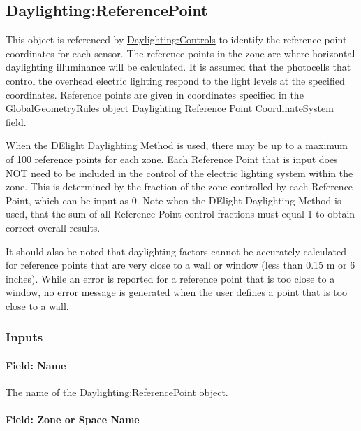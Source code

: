 \subsection{Daylighting:ReferencePoint}\label{daylightingreferencepoint-000}

This object is referenced by \hyperref[daylightingcontrols-000]{Daylighting:Controls} to identify the reference point coordinates for each sensor. The reference points in the zone are where horizontal daylighting illuminance will be calculated. It is assumed that the photocells that control the overhead electric lighting respond to the light levels at the specified coordinates. Reference points are given in coordinates specified in the \hyperref[globalgeometryrules]{GlobalGeometryRules} object Daylighting Reference Point CoordinateSystem field.

When the DElight Daylighting Method is used, there may be up to a maximum of 100 reference points for each zone. Each Reference Point that is input does NOT need to be included in the control of the electric lighting system within the zone. This is determined by the fraction of the zone controlled by each Reference Point, which can be input as 0. Note when the DElight Daylighting Method is used, that the sum of all Reference Point control fractions must equal 1 to obtain correct overall results.

It should also be noted that daylighting factors cannot be accurately calculated for reference points that are very close to a wall or window (less than 0.15 m or 6 inches). While an error is reported for a reference point that is too close to a window, no error message is generated when the user defines a point that is too close to a wall.

\subsubsection{Inputs}\label{inputs-010}

\paragraph{Field: Name}\label{field-name-002}

The name of the Daylighting:ReferencePoint object.

\paragraph{Field: Zone or Space Name}\label{daylightingreferencepoint-field-zone-name}

